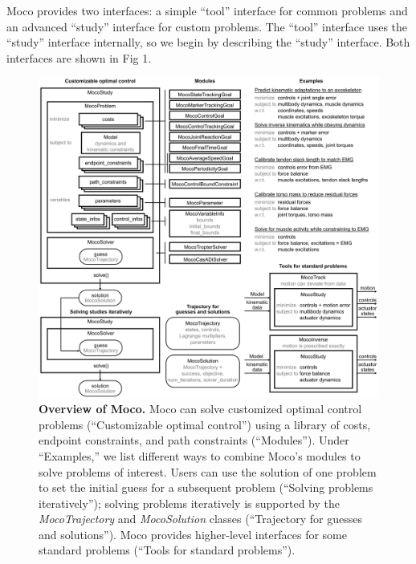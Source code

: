 \documentclass[10pt,letterpaper]{article}
\begin{document}
Moco provides two interfaces: a simple “tool” interface for common problems and an advanced “study” interface for custom problems. The “tool” interface uses the “study” interface internally, so we begin by describing the “study” interface. Both interfaces are shown in Fig 1.

\begin{figure}[!h]
\begin{adjustwidth}{-2.25in}{0in} %
\centering
    \includegraphics{figures/MocoDiagram.png}
    \caption{{\bf Overview of Moco.}
Moco can solve customized optimal control problems (“Customizable optimal control”) using a library of costs, endpoint constraints, and path constraints (“Modules”). Under “Examples,” we list different ways to combine Moco’s modules to solve problems of interest. Users can use the solution of one problem to set the initial guess for a subsequent problem (“Solving problems iteratively”); solving problems iteratively is supported by the \textit{MocoTrajectory} and \textit{MocoSolution} classes (“Trajectory for guesses and solutions”). Moco provides higher-level interfaces for some standard problems (“Tools for standard problems”).}
    \label{mocodiagram}
\end{adjustwidth}
\end{figure}
\end{document}
